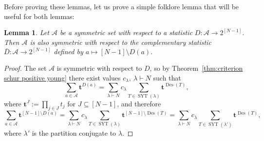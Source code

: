 \documentclass[11pt]{article}
\newtheorem{lemma}[theo]{Lemma}
\theoremstyle{definition}
\numberwithin{equation}{section}
\newcommand{\Des}{\operatorname{Des}}
\newcommand{\Syt}{\operatorname{SYT}}
\newcommand{\A}{\mathcal{A}}
\begin{document}
Before proving these lemmas, let us prove a simple folklore lemma that will be useful for both lemmas:
\begin{lemma}
\label{lem:symmetric complement is symmetric}
    Let $\A$ be a symmetric set with respect to a statistic $D:\A \to 2^{[N-1]}$. Then $\A$ is also symmetric with respect to the complementary statistic $\bar{D}:\A \to 2^{[N-1]}$ defined by $a \mapsto [N-1]\setminus D(a)$.
\end{lemma}
\begin{proof}
    The set $\A$ is symmetric with respect to $D$, so by Theorem~\ref{thm:criterion schur positive young} there exist values $c_{\lambda},\ \lambda \vdash N$ such that
    \[
        \sum_{a \in \A} \boldsymbol{t}^{D(a)} = \sum_{\lambda \vdash N} c_\lambda \sum_{T \in \Syt(\lambda)} \boldsymbol{t}^{\Des(T)},
    \]
    where $\boldsymbol{t}^J := \prod_{j \in J} t_j$ for $J \subseteq [N-1]$, and therefore
    \[
        \sum_{a \in \A} \boldsymbol{t}^{[N-1]\setminus D(a)} = \sum_{\lambda \vdash N} c_\lambda \sum_{T \in \Syt(\lambda)} \boldsymbol{t}^{[N-1]\setminus \Des(T)} = \sum_{\lambda \vdash N} c_\lambda \sum_{T \in \Syt(\lambda')} \boldsymbol{t}^{\Des(T)},
    \]
    where $\lambda'$ is the partition conjugate to $\lambda$.
\end{proof}
\end{document}
